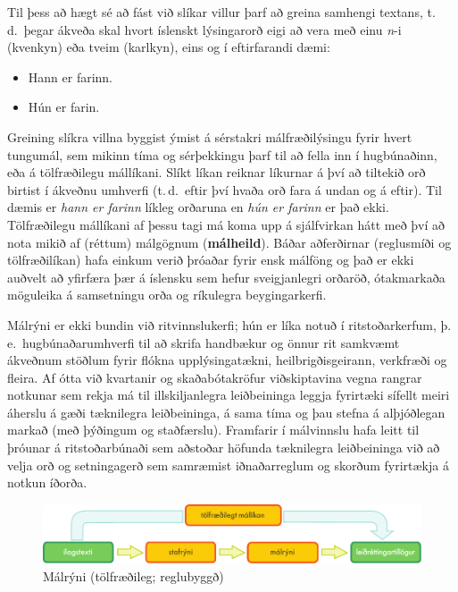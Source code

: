 \documentclass{../../metanetpaper}
\begin{document}
\begin{multicols}{2}
Til þess að hægt sé að fást við slíkar villur þarf að greina samhengi textans, t.\,d.~þegar ákveða skal hvort íslenskt lýsingarorð eigi að vera með einu \textit{n}-i (kvenkyn) eða tveim (karlkyn), eins og í eftirfarandi dæmi:

\begin{itemize}
\item Hann er farinn.
\item Hún er farin.
\end{itemize}

Greining slíkra villna byggist ýmist á sérstakri málfræðilýsingu fyrir hvert tungumál, sem mikinn tíma og sérþekkingu þarf til að fella inn í hugbúnaðinn, eða á tölfræðilegu mállíkani. Slíkt líkan reiknar líkurnar á því að tiltekið orð birtist í ákveðnu umhverfi (t.\,d.~eftir því hvaða orð fara á undan og á eftir). Til dæmis er \textit{hann er farinn} líkleg orðaruna en \textit{hún er farinn} er það ekki. Tölfræðilegu mállíkani af þessu tagi má koma upp á sjálfvirkan hátt með því að nota mikið af (réttum) málgögnum (\textbf{málheild}). Báðar aðferðirnar (reglusmíði og tölfræðilíkan) hafa einkum verið þróaðar fyrir ensk málföng og það er ekki auðvelt að yfirfæra þær á íslensku sem hefur sveigjanlegri orðaröð, ótakmarkaða möguleika á samsetningu orða og ríkulegra beygingarkerfi. 


Málrýni er ekki bundin við ritvinnslukerfi; hún er líka notuð í ritstoðarkerfum, þ.\,e.~hugbúnaðarumhverfi til að skrifa handbækur og önnur rit samkvæmt ákveðnum stöðlum fyrir flókna upplýsingatækni, heilbrigðisgeirann, verkfræði og fleira. Af ótta við kvartanir og skaðabótakröfur viðskiptavina vegna rangrar notkunar sem rekja má til illskiljanlegra leiðbeininga leggja fyrirtæki sífellt meiri áherslu á gæði tæknilegra leiðbeininga, á sama tíma og þau stefna á alþjóðlegan markað (með þýðingum og staðfærslu). Framfarir í málvinnslu hafa leitt til þróunar á ritstoðarbúnaði sem aðstoðar höfunda tæknilegra leiðbeininga við að velja orð og setningagerð sem samræmist iðnaðarreglum og skorðum fyrirtækja á notkun íðorða.

\begin{figure}[htb]
  \center
  \includegraphics[width=\textwidth]{../_media/icelandic/language_checking}
  \caption{Málrýni (tölfræðileg; reglubyggð)}
  \label{fig:langcheckingaarch_is}
\end{figure}


\end{multicols}
\end{document}
